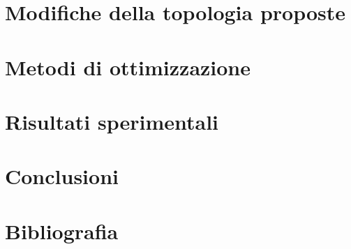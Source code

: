\documentclass[a4paper, 12pt]{book}
\numberwithin{equation}{section}
\numberwithin{figure}{section}
\numberwithin{table}{section}
\begin{document}
	\chapter{Modifiche della topologia proposte} %
	\label{chapter:terzo} %

	\clearpage{\pagestyle{plain}\cleardoublepage} %
	\chapter{Metodi di ottimizzazione} %
	\label{chapter:quarto} %

	\clearpage{\pagestyle{plain}\cleardoublepage} %
	\chapter{Risultati sperimentali} %
	\label{chapter:quinto} %
	
	\clearpage{\pagestyle{plain}\cleardoublepage} %
	\chapter{Conclusioni} %
	\label{chapter:sesto} %

	\pagestyle{plain}
	\cleardoublepage
	\chapter*{Bibliografia} %
	\printbibliography[heading=none]
\end{document}

